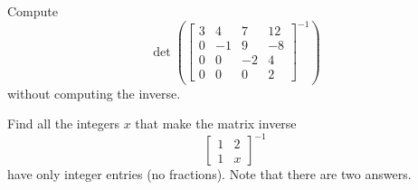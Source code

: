 \begin{exercise}
Compute
\begin{equation*}
\det \left( \begin{bmatrix}
3 & 4 & 7 & 12 \\
0 & -1 & 9 & -8 \\
0 & 0 & -2 & 4 \\
0 & 0 & 0 & 2
\end{bmatrix}^{-1}
\right)
\end{equation*}
without computing the inverse.
\end{exercise}

\begin{exercise}[challenging]
Find all the integers $x$ that make the matrix inverse
\begin{equation*}
\begin{bmatrix}
1 & 2 \\ 1 & x
\end{bmatrix}^{-1}
\end{equation*}
have only integer entries (no fractions).
Note that there are two answers.
\end{exercise}
